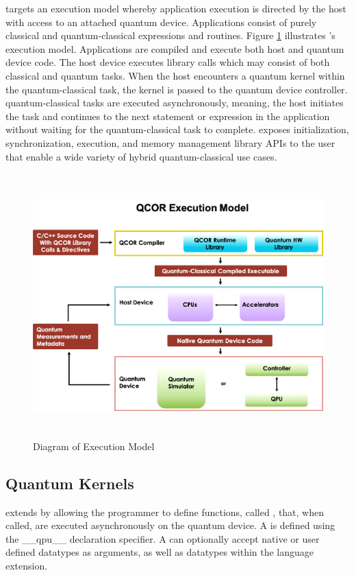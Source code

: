 \qcor targets an execution model whereby application execution is directed by the host with access to an attached quantum device. Applications consist of purely classical and quantum-classical expressions and routines. Figure \ref{fig:exec_model} illustrates \qcor's execution model. Applications are compiled and execute both host and quantum device code. The host device executes \qcor library calls which may consist of both classical and quantum tasks. When the host encounters a quantum kernel within the quantum-classical task, the kernel is passed to the quantum device controller. \qcor quantum-classical tasks are executed asynchronously, meaning, the host initiates the task and continues to the next statement or expression in the application without waiting for the quantum-classical task to complete.
\qcor exposes initialization, synchronization, execution, and memory management library \ac{API}s to the user that enable a wide variety of hybrid quantum-classical use cases.

\begin{figure}
 \centering
 \includegraphics[width=5in,height=4in]{figures/Execution_Model_Illustration_v3.png}
  \caption{Diagram of \qcor Execution Model}
  \label{fig:exec_model}
\end{figure}


\subsection{\textbf{Quantum Kernels}}\label{subsec:kernel}
\qcor extends \CorCpp by allowing the programmer to define functions, called , that, when called, are executed asynchronously on the quantum device. A  is defined using the \_\_qpu\_\_ declaration specifier. A  can optionally accept native or user defined \CorCpp datatypes as arguments, as well as datatypes within the \qcor language extension.


